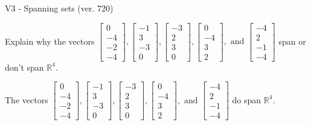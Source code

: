 \begin{exercise}
  \begin{exerciseTitle}V3 - Spanning sets (ver. 720)\end{exerciseTitle}
  \begin{exerciseStatement}
    Explain why the vectors \(\left[\begin{array}{r}
0 \\
-4 \\
-2 \\
-4
\end{array}\right] , \left[\begin{array}{r}
-1 \\
3 \\
-3 \\
0
\end{array}\right] , \left[\begin{array}{r}
-3 \\
2 \\
3 \\
0
\end{array}\right] , \left[\begin{array}{r}
0 \\
-4 \\
3 \\
2
\end{array}\right] , \text{ and } \left[\begin{array}{r}
-4 \\
2 \\
-1 \\
-4
\end{array}\right]\) span or don't span \(\mathbb{R}^4\). 
	


  \end{exerciseStatement}
  \begin{exerciseAnswer}
   The vectors \(\left[\begin{array}{r}
0 \\
-4 \\
-2 \\
-4
\end{array}\right] , \left[\begin{array}{r}
-1 \\
3 \\
-3 \\
0
\end{array}\right] , \left[\begin{array}{r}
-3 \\
2 \\
3 \\
0
\end{array}\right] , \left[\begin{array}{r}
0 \\
-4 \\
3 \\
2
\end{array}\right] , \text{ and } \left[\begin{array}{r}
-4 \\
2 \\
-1 \\
-4
\end{array}\right]\) 
  	 do  
	span \(\mathbb{R}^4\).
  



\end{exerciseAnswer}
\end{exercise}
